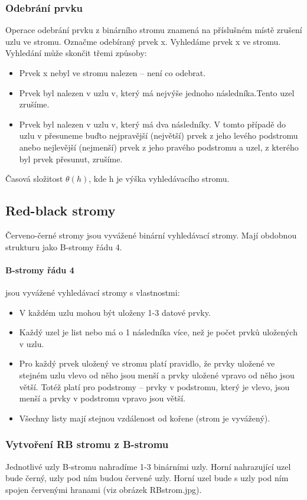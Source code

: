 \documentclass[10pt,a4paper]{article}
\begin{document}
\subsubsection{Odebrání prvku}
Operace odebrání prvku z binárního stromu znamená na příslušném místě zrušení uzlu ve stromu. Označme odebíraný prvek x. Vyhledáme prvek x ve stromu. Vyhledání může skončit třemi způsoby:
\begin{itemize}
	\item Prvek x nebyl ve stromu nalezen – není co odebrat.
	\item Prvek byl nalezen v uzlu v, který má nejvýše jednoho následníka.Tento uzel zrušíme.
	\item Prvek byl nalezen v uzlu v, který má dva následníky. V tomto případě do uzlu v přesuneme buďto nejpravější (největší) prvek z jeho levého podstromu anebo nejlevější (nejmenší) prvek z jeho pravého podstromu a uzel, z kterého byl prvek přesunut, zrušíme.
\end{itemize}
Časová složitost $\theta(h)$, kde h je výška vyhledávacího stromu.




\subsection{Red-black stromy}
Červeno-černé stromy jsou vyvážené binární vyhledávací stromy. Mají obdobnou strukturu jako B-stromy řádu 4.
\paragraph{B-stromy řádu 4}
jsou vyvážené vyhledávací stromy s vlastnostmi:
\begin{itemize}
	\item V každém uzlu mohou být uloženy 1-3 datové prvky.
	\item Každý uzel je list nebo má o 1 následníka více, než je počet prvků uložených v uzlu.
	\item Pro každý prvek uložený ve stromu platí pravidlo, že prvky uložené ve stejném uzlu vlevo od něho jsou menší a prvky uložené vpravo od něho jsou větší. Totéž platí pro podstromy – prvky v podstromu, který je vlevo, jsou menší a prvky v podstromu vpravo jsou větší.
	\item Všechny listy mají stejnou vzdálenost od kořene (strom je vyvážený).
\end{itemize}
\subsubsection{Vytvoření RB stromu z B-stromu}
Jednotlivé uzly B-stromu nahradíme 1-3 binárními uzly. Horní nahrazující uzel bude černý, uzly pod ním budou červené uzly. Horní uzel bude s uzly pod ním spojen červenými hranami (viz obrázek RBstrom.jpg).
\end{document}
